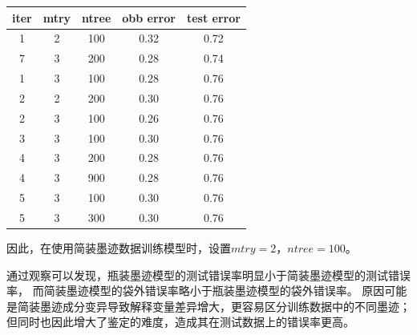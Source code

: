 \documentclass[12pt,a4paper]{article}
\begin{document}
    \begin{longtable}{c|c|c|c|c}
        \hline
        \textbf{iter} & \textbf{mtry} & \textbf{ntree} & \textbf{obb error} & \textbf{test error}\\
        \hline
        1 & 2 & 100 & 0.32 & 0.72\\
        \hline
        7 & 3 & 200 & 0.28 & 0.74\\
        \hline
        1 & 3 & 100 & 0.28 & 0.76\\
        \hline
        2 & 2 & 200 & 0.30 & 0.76\\
        \hline
        2 & 3 & 100 & 0.26 & 0.76\\
        \hline
        3 & 3 & 100 & 0.30 & 0.76\\
        \hline
        4 & 3 & 200 & 0.28 & 0.76\\
        \hline
        4 & 3 & 900 & 0.28 & 0.76\\
        \hline
        5 & 3 & 100 & 0.30 & 0.76\\
        \hline
        5 & 3 & 300 & 0.30 & 0.76\\
        \hline
    \end{longtable}
    因此，在使用简装墨迹数据训练模型时，设置$mtry=2$，$ntree=100$。\par
    通过观察可以发现，瓶装墨迹模型的测试错误率明显小于简装墨迹模型的测试错误率，
    而简装墨迹模型的袋外错误率略小于瓶装墨迹模型的袋外错误率。
    原因可能是简装墨迹成分变异导致解释变量差异增大，更容易区分训练数据中的不同墨迹；
    但同时也因此增大了鉴定的难度，造成其在测试数据上的错误率更高。
\end{document}
